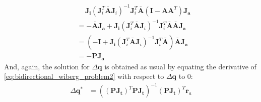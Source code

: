 \begin{equation}
\begin{aligned}
        \\
        & \quad \, \mathbf{J}_{\mathbf{i}} \left( \mathbf{J}_i^T \bar{\mathbf{A}} \mathbf{J}_i \right)^{-1} \mathbf{J}_i^T \bar{\mathbf{A}} \left( \mathbf{I} - \mathbf{A}\mathbf{A}^T \right) \mathbf{J}_{\mathbf{a}}
        \\
        & = - \bar{\mathbf{A}} \mathbf{J}_{\mathbf{a}} + \mathbf{J}_{\mathbf{i}} \left( \mathbf{J}_i^T \bar{\mathbf{A}} \mathbf{J}_i \right)^{-1} \mathbf{J}_i^T \bar{\mathbf{A}} \bar{\mathbf{A}} \mathbf{J}_{\mathbf{a}}
        \\
        & = \left( -\mathbf{I} + \mathbf{J}_{\mathbf{i}} \left( \mathbf{J}_i^T \bar{\mathbf{A}} \mathbf{J}_i \right)^{-1} \mathbf{J}_i^T \bar{\mathbf{A}} \right) \bar{\mathbf{A}} \mathbf{J}_{\mathbf{a}}
        \\
        & = - \mathbf{P} \mathbf{J}_{\mathbf{a}}
    \label{eq:bidirectional_wiberg_jacobian}
    \end{aligned}
\end{equation}
 And, again, the solution for $\Delta\mathbf{q}$ is obtained as usual by equating the derivative of \ref{eq:bidirectional_wiberg_problem2} with respect to $\Delta\mathbf{q}$ to 0:
 \begin{equation}
    \begin{aligned}
    	\Delta \mathbf{q}^* & = \left( \left( \mathbf{P} \mathbf{J}_{\mathbf{t}} \right)^T \mathbf{P} \mathbf{J}_{\mathbf{t}} \right)^{-1} \left( \mathbf{P} \mathbf{J}_{\mathbf{t}} \right)^T \bar{\mathbf{r}}_a
    \label{eq:bidirectional_wiberg_solution}
    \end{aligned}
\end{equation}

